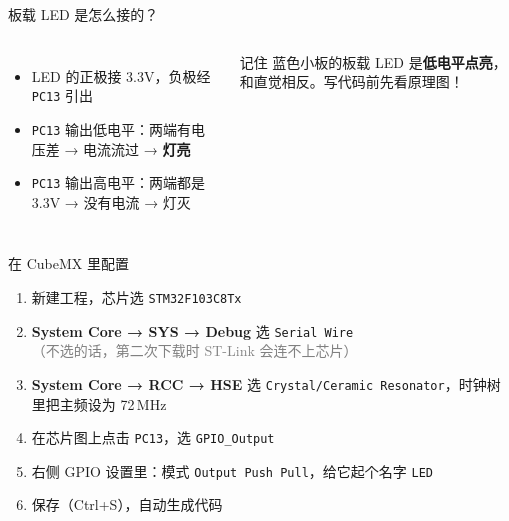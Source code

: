 \documentclass[aspectratio=169,11pt]{ctexbeamer}
\begin{document}
\begin{frame}{板载 LED 是怎么接的？}
  \begin{columns}[c]
    \centering
    \begin{itemize}
      \item LED 的正极接 3.3V，负极经 \texttt{PC13} 引出
      \item \texttt{PC13} 输出\alert{低电平}：两端有电压差 → 电流流过 → \textbf{灯亮}
      \item \texttt{PC13} 输出高电平：两端都是 3.3V → 没有电流 → 灯灭
    \end{itemize}
    \begin{alertblock}{记住}
      蓝色小板的板载 LED 是\textbf{低电平点亮}，和直觉相反。写代码前先看原理图！
    \end{alertblock}
  \end{columns}
\end{frame}

\begin{frame}{在 CubeMX 里配置}
  \begin{enumerate}
    \item 新建工程，芯片选 \texttt{STM32F103C8Tx}
    \item \textbf{System Core → SYS → Debug} 选 \texttt{Serial Wire}\\
      \small\textcolor{gray}{（不选的话，第二次下载时 ST-Link 会连不上芯片）}\normalsize
    \item \textbf{System Core → RCC → HSE} 选 \texttt{Crystal/Ceramic Resonator}，时钟树里把主频设为 72\,MHz
    \item 在芯片图上点击 \texttt{PC13}，选 \texttt{GPIO\_Output}
    \item 右侧 GPIO 设置里：模式 \texttt{Output Push Pull}，给它起个名字 \texttt{LED}
    \item 保存（Ctrl+S），自动生成代码
  \end{enumerate}
\end{frame}
\end{document}
